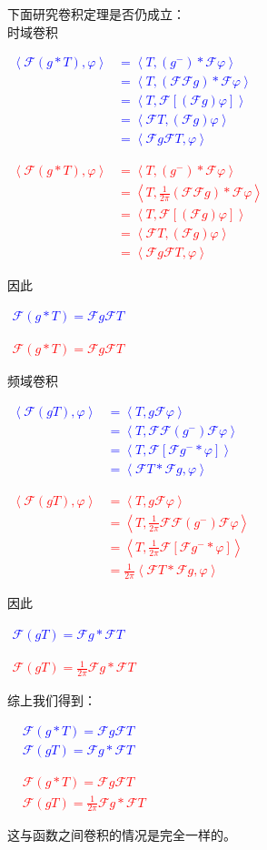 \documentclass{ctexbook}
\newcommand{\lr}[2]{%
    \begin{center}
    \begin{minipage}[t]{0.45\textwidth}
        \centering
        \allowdisplaybreaks
        \textcolor{blue}{%
            \begin{varwidth}{\linewidth}
            $\begin{aligned}
            #1
            \end{aligned}$
            \end{varwidth}
        }
    \end{minipage}
    \hfill
    \begin{minipage}[t]{0.45\textwidth}
        \centering
        \allowdisplaybreaks
        \textcolor{red}{%
            \begin{varwidth}{\linewidth}
            $\begin{aligned}
            #2
            \end{aligned}$
            \end{varwidth}
        }
    \end{minipage}
\end{center}
}
\begin{document}
下面研究卷积定理是否仍成立：\\时域卷积
\lr{
    \left\langle \mathcal{F} (g*T),\varphi\right\rangle&=\left\langle T,(g^-)*\mathcal{F} \varphi\right\rangle\\
    &=\left\langle T,(\mathcal{F} \mathcal{F} g)*\mathcal{F} \varphi\right\rangle\\
    &=\left\langle T,\mathcal{F} [(\mathcal{F} g) \varphi]\right\rangle\\
    &=\left\langle \mathcal{F} T,(\mathcal{F} g)\varphi\right\rangle\\
    &=\left\langle \mathcal{F} g\mathcal{F} T,\varphi\right\rangle
}{
    \left\langle \mathcal{F} (g*T),\varphi\right\rangle&=\left\langle T,(g^-)*\mathcal{F} \varphi\right\rangle\\
    &=\left\langle T,\frac{1}{2\pi}(\mathcal{F} \mathcal{F} g)*\mathcal{F} \varphi\right\rangle\\
    &=\left\langle T,\mathcal{F} [(\mathcal{F} g) \varphi]\right\rangle\\
    &=\left\langle \mathcal{F} T,(\mathcal{F} g)\varphi\right\rangle\\
    &=\left\langle \mathcal{F} g\mathcal{F} T,\varphi\right\rangle
}
因此\lr{
    \mathcal{F} (g*T)=\mathcal{F} g\mathcal{F} T
}{
    \mathcal{F} (g*T)=\mathcal{F} g\mathcal{F} T
}
频域卷积
\lr{
    \left\langle \mathcal{F} (gT),\varphi\right\rangle&=\left\langle T,g\mathcal{F} \varphi\right\rangle\\
    &=\left\langle T,\mathcal{F} \mathcal{F} (g^-) \mathcal{F} \varphi\right\rangle\\
    &=\left\langle T,\mathcal{F} [\mathcal{F} g^- *\varphi]\right\rangle\\
    &=\left\langle\mathcal{F} T*\mathcal{F} g,\varphi\right\rangle
}{
    \left\langle\mathcal{F} (gT),\varphi\right\rangle&=\left\langle T,g\mathcal{F} \varphi\right\rangle\\
    &=\left\langle T,\frac{1}{2\pi}\mathcal{F} \mathcal{F} (g^-) \mathcal{F} \varphi\right\rangle\\
    &=\left\langle T,\frac{1}{2\pi}\mathcal{F} [\mathcal{F} g^- *\varphi]\right\rangle\\
    &=\frac{1}{2\pi}\left\langle\mathcal{F} T*\mathcal{F} g,\varphi\right\rangle
}
因此\lr{
    \mathcal{F} (gT)=\mathcal{F} g*\mathcal{F} T
}{
    \mathcal{F} (gT)=\frac{1}{2\pi}\mathcal{F} g*\mathcal{F} T
}
综上我们得到：\begin{theorem}[分布与函数的卷积定理]
    \quad
    \lr{
    &\mathcal{F} (g*T)=\mathcal{F} g\mathcal{F} T \\
    &\mathcal{F} (gT)=\mathcal{F} g*\mathcal{F} T
}{
    &\mathcal{F} (g*T)=\mathcal{F} g\mathcal{F} T \\
    &\mathcal{F} (gT)=\frac{1}{2\pi}\mathcal{F} g*\mathcal{F} T
}
\end{theorem}
这与函数之间卷积的情况是完全一样的。
\end{document}

